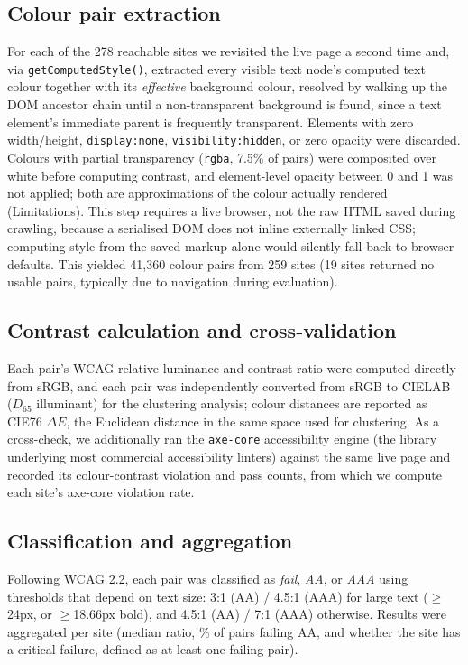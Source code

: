 \documentclass[10pt]{article}
\begin{document}
\subsection{Colour pair extraction}
For each of the 278 reachable sites we revisited the live page a second time and, via \texttt{getComputedStyle()}, extracted every visible text node's computed text colour together with its \emph{effective} background colour, resolved by walking up the DOM ancestor chain until a non-transparent background is found, since a text element's immediate parent is frequently transparent. Elements with zero width/height, \texttt{display:none}, \texttt{visibility:hidden}, or zero opacity were discarded. Colours with partial transparency (\texttt{rgba}, 7.5\% of pairs) were composited over white before computing contrast, and element-level opacity between 0 and 1 was not applied; both are approximations of the colour actually rendered (Limitations). This step requires a live browser, not the raw HTML saved during crawling, because a serialised DOM does not inline externally linked CSS; computing style from the saved markup alone would silently fall back to browser defaults. This yielded 41,360 colour pairs from 259 sites (19 sites returned no usable pairs, typically due to navigation during evaluation).

\subsection{Contrast calculation and cross-validation}
Each pair's WCAG relative luminance and contrast ratio were computed directly from sRGB, and each pair was independently converted from sRGB to CIELAB~\citep{cie1976colorimetry} ($D_{65}$ illuminant) for the clustering analysis; colour distances are reported as CIE76 $\Delta E$, the Euclidean distance in the same space used for clustering. As a cross-check, we additionally ran the \texttt{axe-core} accessibility engine (the library underlying most commercial accessibility linters) against the same live page and recorded its colour-contrast violation and pass counts, from which we compute each site's axe-core violation rate.

\subsection{Classification and aggregation}
Following WCAG 2.2, each pair was classified as \emph{fail}, \emph{AA}, or \emph{AAA} using thresholds that depend on text size: 3:1 (AA) / 4.5:1 (AAA) for large text ($\geq$24px, or $\geq$18.66px bold), and 4.5:1 (AA) / 7:1 (AAA) otherwise. Results were aggregated per site (median ratio, \% of pairs failing AA, and whether the site has a critical failure, defined as at least one failing pair).
\end{document}
